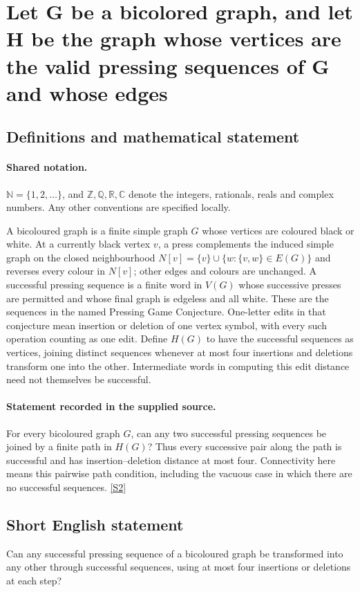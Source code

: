 \documentclass[11pt]{article}
\newcommand{\sref}[2]{\hyperlink{source:#1:#2}{[S#2]}}
\begin{document}
\section{Let G be a bicolored graph, and let H be the graph whose vertices are the valid pressing sequences of G and whose edges}\label{statement}

\subsection{Definitions and mathematical statement}

\paragraph{Shared notation.}$\mathbb N=\{1,2,\ldots\}$, and $\mathbb Z,\mathbb Q,\mathbb R,\mathbb C$ denote the integers, rationals, reals and complex numbers. Any other conventions are specified locally.


A bicoloured graph is a finite simple graph $G$ whose vertices are coloured black or white. At a currently black vertex $v$, a press complements the induced simple graph on the closed neighbourhood $N[v]=\{v\}\cup\{w:\{v,w\}\in E(G)\}$ and reverses every colour in $N[v]$; other edges and colours are unchanged. A successful pressing sequence is a finite word in $V(G)$ whose successive presses are permitted and whose final graph is edgeless and all white. These are the sequences in the named Pressing Game Conjecture. One-letter edits in that conjecture mean insertion or deletion of one vertex symbol, with every such operation counting as one edit.
Define $H(G)$ to have the successful sequences as vertices, joining distinct sequences whenever at most four insertions and deletions transform one into the other. Intermediate words in computing this edit distance need not themselves be successful.

\paragraph{Statement recorded in the supplied source.}
For every bicoloured graph $G$, can any two successful pressing sequences be joined by a finite path in $H(G)$? Thus every successive pair along the path is successful and has insertion--deletion distance at most four. Connectivity here means this pairwise path condition, including the vacuous case in which there are no successful sequences. \sref{statement}{2}

\subsection{Short English statement}
Can any successful pressing sequence of a bicoloured graph be transformed into any other through successful sequences, using at most four insertions or deletions at each step?
\end{document}

